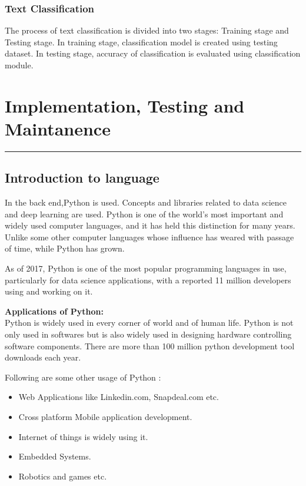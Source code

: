 \subsection{Text Classification}
The process of text classification is divided into two stages: Training stage and Testing stage. In training stage, classification model is created using testing dataset. In testing stage, accuracy of classification is evaluated using classification module.
\chapter{Implementation, Testing and Maintanence}\hrule
\label{Chapter:4}

\section{Introduction to language}

In the back end,Python is used. Concepts and libraries related to data science and deep learning are used. Python is one of the world's most important and widely used computer languages, and it has held this distinction for many years. Unlike some other computer languages whose influence has weared with passage of time, while Python has grown.

As of 2017, Python is one of the most popular programming languages in use, particularly for data science applications, with a reported 11 million developers using and working on it.

\textbf{Applications of Python:}\\
Python is widely used in every corner of world and of human life. Python is not only used in softwares but is also widely used in designing hardware controlling software components. There are more than 100 million python development tool downloads each year.

Following are some other usage of Python :
\begin{itemize}
	\item Web Applications like Linkedin.com, Snapdeal.com etc.
	\item	Cross platform Mobile application development.
	\item Internet of things is widely using it.
	\item	Embedded Systems.
	\item Robotics and games etc.
\end{itemize}

